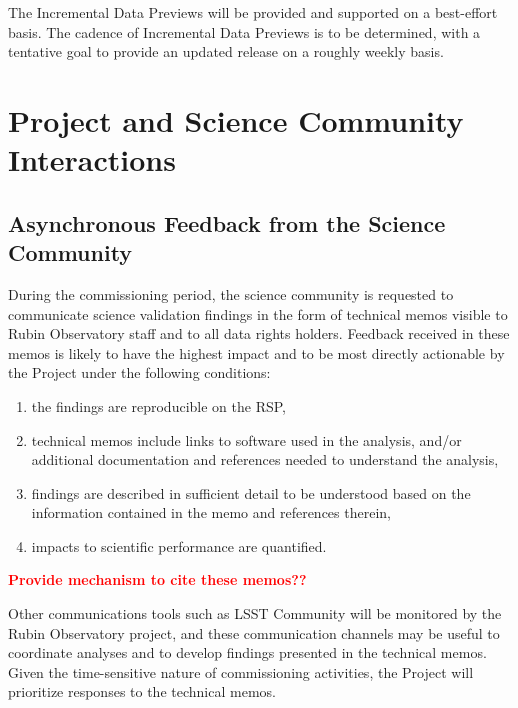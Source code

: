 \documentclass[SE,authoryear,toc]{lsstdoc}
\newcommand{\FIXME}[1]{{\bf \textcolor{red}{#1}}}
\begin{document}
The Incremental Data Previews will be provided and supported on a best-effort basis.
The cadence of Incremental Data Previews is to be determined, with a tentative goal to provide an updated release on a roughly weekly basis.

\section{Project and Science Community Interactions}

\subsection{Asynchronous Feedback from the Science Community}

During the commissioning period, the science community is requested to communicate science validation findings in the form of technical memos visible to Rubin Observatory staff and to all data rights holders. 
Feedback received in these memos is likely to have the highest impact and to be most directly actionable by the Project under the following conditions:

\begin{enumerate}

\item the findings are reproducible on the RSP,

\item technical memos include links to software used in the analysis, and/or additional documentation and references needed to understand the analysis,

\item findings are described in sufficient detail to be understood based on the information contained in the memo and references therein,

\item impacts to scientific performance are quantified.

\end{enumerate}

\FIXME{Provide mechanism to cite these memos??}

Other communications tools such as LSST Community will be monitored by the Rubin Observatory project, and these communication channels may be useful to coordinate analyses and to develop findings presented in the technical memos.
Given the time-sensitive nature of commissioning activities, the Project will prioritize responses to the technical memos.

\end{document}
